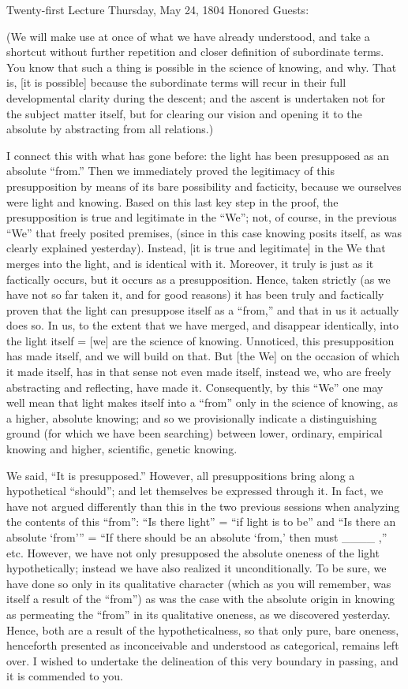 Twenty-first Lecture
Thursday, May 24, 1804
Honored Guests:

(We will make use at once of what we have already understood,
and take a shortcut without further repetition
and closer definition of subordinate terms.
You know that such a thing is possible
in the science of knowing, and why.
That is, [it is possible] because
the subordinate terms will recur
in their full developmental clarity during the descent;
and the ascent is undertaken not for the subject matter itself,
but for clearing our vision
and opening it to the absolute
by abstracting from all relations.)

I connect this with what has gone before:
the light has been presupposed as an absolute “from.”
Then we immediately proved the legitimacy of
this presupposition by means of
its bare possibility and facticity,
because we ourselves were light and knowing.
Based on this last key step in the proof,
the presupposition is true and legitimate in the “We”;
not, of course, in the previous “We” that freely posited premises,
(since in this case knowing posits itself,
as was clearly explained yesterday).
Instead, [it is true and legitimate] in the We
that merges into the light,
and is identical with it.
Moreover, it truly is just as it factically occurs,
but it occurs as a presupposition.
Hence, taken strictly
(as we have not so far taken it, and for good reasons)
it has been truly and factically proven that
the light can presuppose itself as a “from,”
and that in us it actually does so.
In us, to the extent that we have merged,
and disappear identically, into the light itself =
[we] are the science of knowing.
Unnoticed, this presupposition has made itself,
and we will build on that.
But [the We] on the occasion of which it made itself,
has in that sense not even made itself,
instead we, who are freely abstracting and reflecting, have made it.
Consequently, by this “We” one may well mean that
light makes itself into a “from” only
in the science of knowing, as a higher, absolute knowing;
and so we provisionally indicate a distinguishing ground
(for which we have been searching)
between lower, ordinary, empirical knowing
and higher, scientific, genetic knowing.

We said, “It is presupposed.”
However, all presuppositions
bring along a hypothetical “should”;
and let themselves be expressed through it.
In fact, we have not argued differently than this
in the two previous sessions
when analyzing the contents of this “from”:
“Is there light” = “if light is to be”
and “Is there an absolute ‘from'” =
“If there should be an absolute ‘from,'
then must ____ ,” etc.
However, we have not only presupposed
the absolute oneness of the light hypothetically;
instead we have also realized it unconditionally.
To be sure, we have done so only in its qualitative character
(which as you will remember, was itself a result of the “from”)
as was the case with the absolute origin in knowing
as permeating the “from” in its qualitative oneness,
as we discovered yesterday.
Hence, both are a result of the hypotheticalness,
so that only pure, bare oneness,
henceforth presented as inconceivable
and understood as categorical,
remains left over.
I wished to undertake the delineation of
this very boundary in passing,
and it is commended to you.

